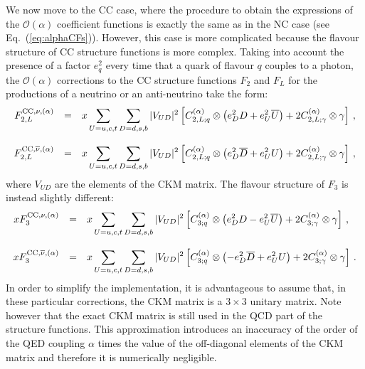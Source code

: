 We now move to the CC case, where the procedure to obtain the
expressions of the $\mathcal{O}(\alpha)$ coefficient functions is
exactly the same as in the NC case (see
Eq.~(\ref{eq:alphaCFs})). However, this case is more complicated
because the flavour structure of CC structure functions is more
complex.
%
Taking into account the presence of a factor $e_q^2$ every time that a
quark of flavour $q$ couples to a photon, the $\mathcal{O}(\alpha)$
corrections to the CC structure functions $F_2$ and $F_L$ for the
productions of a neutrino or an anti-neutrino take the form:
\begin{equation}\label{compactNu}
\begin{array}{rcl}
F_{2,L}^{{\rm CC},\nu,(\alpha)} &=& \displaystyle
                              x\sum_{U=u,c,t}\sum_{D=d,s,b}|V_{UD}|^2\left[C_{2,L;q}^{(\alpha)}\otimes\left(e_D^2D +e_U^2\overline{U}\right) +2 C_{2,L;\gamma}^{(\alpha)}\otimes\gamma\right]\,,\\
\\
F_{2,L}^{{\rm CC},\overline{\nu},(\alpha)} &=& \displaystyle
x\sum_{U=u,c,t}\sum_{D=d,s,b}|V_{UD}|^2\left[C_{2,L;q}^{(\alpha)}\otimes\left(e_D^2\overline{D}
    +e_U^2U\right) +2 C_{2,L;\gamma}^{(\alpha)}\otimes\gamma\right]\,,
\end{array}
\end{equation}
where $V_{UD}$ are the elements of the CKM matrix.
%
The flavour structure of $F_3$ is instead slightly different:
\begin{equation}\label{compactNuF3}
\begin{array}{rcl}
xF_3^{{\rm CC},\nu,(\alpha)} &=& \displaystyle
                              x\sum_{U=u,c,t}\sum_{D=d,s,b}|V_{UD}|^2\left[C_{3;q}^{(\alpha)}\otimes\left(e_D^2D -e_U^2\overline{U}\right) +2 C_{3;\gamma}^{(\alpha)}\otimes\gamma\right]\,,\\
\\
xF_3^{{\rm CC},\overline{\nu},(\alpha)} &=& \displaystyle
x\sum_{U=u,c,t}\sum_{D=d,s,b}|V_{UD}|^2\left[C_{3;q}^{(\alpha)}\otimes\left(-e_D^2\overline{D}
    +e_U^2U\right) +2 C_{3;\gamma}^{(\alpha)}\otimes\gamma\right]\,.
\end{array}
\end{equation}
In order to simplify the implementation, it is advantageous to assume
that, in these particular corrections, the CKM matrix is a $3 \times 3$
unitary matrix. Note however that the exact CKM matrix is still used
in the QCD part of the structure functions.
%
This approximation introduces an inaccuracy of the order of the QED
coupling $\alpha$ times the value of the off-diagonal elements of the
CKM matrix and therefore it is numerically negligible.

